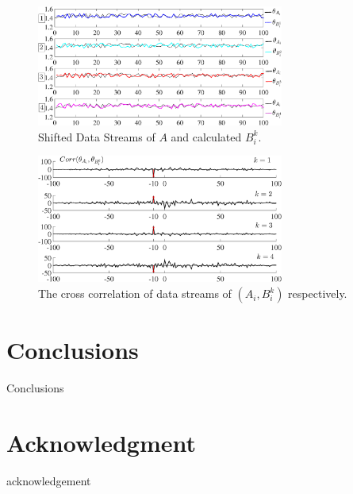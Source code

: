 \documentclass[conference,letterpaper]{IEEEtran}
\begin{document}
\begin{center}
\begin{figure}[htbp]
\centering
\includegraphics[width=3.2in]{fig7.eps}
\caption{
Shifted Data Streams of $A$ and calculated $B_{i}^{k}$.
}
\label{fig7}
\end{figure}
\end{center}
\begin{center}

\begin{figure}[htbp]
\centering
\includegraphics[width=3.2in]{fig8.eps}
\caption{
The cross correlation of data streams of $(A_{i},B_{i}^{k})$ respectively.
}
\label{fig8}
\end{figure}
\end{center}

\section{Conclusions}
\label{sect5}

Conclusions

\section*{Acknowledgment}

acknowledgement






%
%
\end{document}
